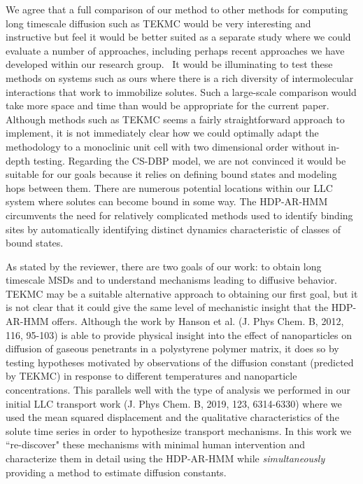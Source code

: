 \documentclass{article}
\begin{document}
\begin{enumerate}[label={Comment \theenumi :}, leftmargin=3.9\parindent]
    We agree that a full comparison of our method to other methods for computing long timescale 
    diffusion such as TEKMC would be very interesting and instructive but feel it would be better 
    suited as a separate study where we could evaluate a number of approaches, including perhaps
    recent approaches we have developed within our research group.~\cite{coscia_capturing_2020}
    It would be illuminating to test these methods on systems such as ours where there is
    a rich diversity of intermolecular interactions that work to immobilize solutes.
    Such a large-scale comparison would take more space and time than would be appropriate for 
    the current paper. Although methods such as TEKMC seems a fairly straightforward approach to
    implement, it is not immediately clear how we could optimally adapt the methodology to a 
    monoclinic unit cell with two dimensional order without in-depth testing.
    Regarding the CS-DBP model, we are not convinced it would be suitable for our goals because
    it relies on defining bound states and modeling hops between them. There are numerous potential
    locations within our LLC system where solutes can become bound in some way. The HDP-AR-HMM
    circumvents the need for relatively complicated methods used to identify binding sites 
    by automatically identifying distinct dynamics characteristic of classes of bound states. 
    
    As stated by the reviewer, there are two goals of our work: to obtain long timescale MSDs and
    to understand mechanisms leading to diffusive behavior. TEKMC may be a suitable alternative 
    approach to obtaining our first goal, but it is not clear that it could give the same level
    of mechanistic insight that the HDP-AR-HMM offers. Although the work by Hanson et al.
    (J. Phys Chem. B, 2012, 116, 95-103) is able to provide physical insight into the effect of
    nanoparticles on diffusion of gaseous penetrants in a polystyrene polymer matrix, it does so
    by testing hypotheses motivated by observations of the diffusion constant (predicted by TEKMC)
    in response to different temperatures and nanoparticle concentrations. This parallels well
    with the type of analysis we performed in our initial LLC transport work (J. Phys Chem. B, 2019, 123, 6314-6330)
    where we used the mean squared displacement and the qualitative characteristics of the solute
    time series in order to hypothesize transport mechanisms. In this work we ``re-discover" these
    mechanisms with minimal human intervention and characterize them in detail using the 
    HDP-AR-HMM while \textit{simultaneously} providing a method to estimate diffusion constants.


\end{enumerate}
\end{document}
